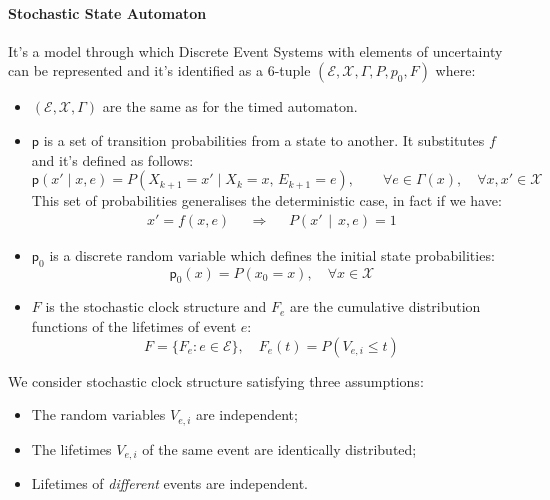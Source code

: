 \documentclass[12pt,a4paper]{article}
\newcommand*{\transp}{\mathsf{p}}
\begin{document}
\paragraph{Stochastic State Automaton}
It’s a model through which Discrete Event Systems with elements of uncertainty can be represented and it’s identified as a $6$-tuple $(\mathcal{E},\mathcal{X},\Gamma,P,p_0,F)$ where:
\begin{itemize}
\item $(\mathcal{E},\mathcal{X},\Gamma)$ are the same as for the timed automaton.
\item $\transp$ is a set of transition probabilities from a state to another. It substitutes $f$ and it’s defined as follows:
$$
\transp(x' \mid x,e) = P\left(X_{k+1} = x' \mid X_k = x, \, E_{k+1} = e\right), \qquad \forall e \in \Gamma(x) , \quad \forall x,x' \in \mathcal{X}
$$
This set of probabilities generalises the deterministic case, in fact if we have:
$$
\begin{matrix}
x'=f(x,e)&&\Rightarrow && P(x'\hspace{5pt}|\hspace{5pt}x,e)=1
\end{matrix}
$$
\item $\transp_0$ is a discrete random variable which defines the initial state probabilities:
$$
\transp_0(x)=P(x_0 = x), \quad \forall x\in \mathcal{X}
$$
\item $F$ is the stochastic clock structure and $F_e$ are the cumulative distribution functions of the lifetimes of event $e$:
$$
F = \{F_e : e \in \mathcal{E}\}, \quad F_e(t) = P(V_{e,i} \leq t)
$$
\end{itemize}
\noindent
We consider stochastic clock structure satisfying three assumptions:
\begin{itemize}
	\item The random variables $V_{e,i}$ are independent;
	\item The lifetimes $V_{e,i}$ of the same event are identically distributed;
	\item Lifetimes of \textit{different} events are independent.
\end{itemize}
\end{document}
